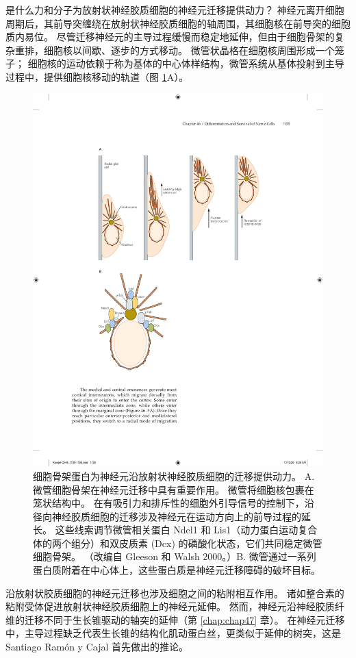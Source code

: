 是什么力和分子为放射状神经胶质细胞的神经元迁移提供动力？ 神经元离开细胞周期后，其前导突缠绕在放射状神经胶质细胞的轴周围，其细胞核在前导突的细胞质内易位。 尽管迁移神经元的主导过程缓慢而稳定地延伸，但由于细胞骨架的复杂重排，细胞核以间歇、逐步的方式移动。 
微管状晶格在细胞核周围形成一个笼子； 细胞核的运动依赖于称为基体的中心体样结构，微管系统从基体投射到主导过程中，提供细胞核移动的轨道（图 \ref{fig:46_7}A）。

\begin{figure}[htbp]
	\centering
	\includegraphics[width=0.8\linewidth]{chap46/fig_46_7}
	\caption{细胞骨架蛋白为神经元沿放射状神经胶质细胞的迁移提供动力。 A. 微管细胞骨架在神经元迁移中具有重要作用。 微管将细胞核包裹在笼状结构中。 在有吸引力和排斥性的细胞外引导信号的控制下，沿径向神经胶质细胞的迁移涉及神经元在运动方向上的前导过程的延长。 这些线索调节微管相关蛋白 Ndel1 和 Lis1（动力蛋白运动复合体的两个组分）和双皮质素 (Dcx) 的磷酸化状态，它们共同稳定微管细胞骨架。 （改编自 Gleeson 和 Walsh 2000。）B. 微管通过一系列蛋白质附着在中心体上，这些蛋白质是神经元迁移障碍的破坏目标。}
	\label{fig:46_7}
\end{figure}

沿放射状胶质细胞的神经元迁移也涉及细胞之间的粘附相互作用。 诸如整合素的粘附受体促进放射状神经胶质细胞上的神经元延伸。 然而，神经元沿神经胶质纤维的迁移不同于生长锥驱动的轴突的延伸（第 \ref{chap:chap47} 章）。 在神经元迁移中，主导过程缺乏代表生长锥的结构化肌动蛋白丝，更类似于延伸的树突，这是 Santiago Ramón y Cajal 首先做出的推论。

